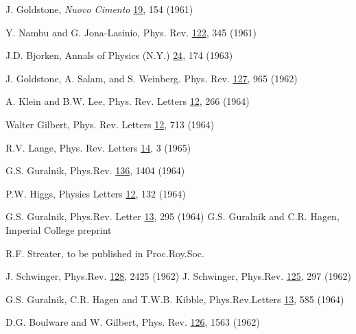 \documentclass[%
  12pt,
  paper=letter,
  abstracton,
  pagesize=auto,
  version=last,
  DIV=calc
  ]{scrartcl}
\begin{document}
\begin{thebibliography}{99}

J. Goldstone, {\it Nuovo Cimento} {\underline {19}},  154 (1961)

Y. Nambu and G. Jona-Lasinio, Phys. Rev. {\underline{122}}, 345 (1961)

J.D. Bjorken, Annals of Physics (N.Y.) {\underline {24}}, 174 (1963)

J. Goldstone, A. Salam, and S. Weinberg.  Phys. Rev. {\underline {127}}, 965 (1962)

A. Klein and B.W. Lee, Phys. Rev. Letters {\underline {12}}, 266 (1964)

Walter Gilbert, Phys. Rev. Letters {\underline{12}}, 713 (1964)

R.V. Lange, Phys. Rev. Letters {\underline {14}}, 3 (1965)

G.S. Guralnik, Phys.Rev. {\underline{136}}, 1404 (1964)

P.W. Higgs, Physics Letters {\underline{12}}, 132 (1964)

G.S. Guralnik, Phys.Rev. Letter {\underline{13}}, 295 (1964)
\newline G.S. Guralnik and C.R. Hagen, Imperial College preprint

R.F. Streater, to be published in Proc.Roy.Soc.

J. Schwinger, Phys.Rev. {\underline{128}}, 2425 (1962)
\newline J. Schwinger, Phys.Rev. {\underline {125}}, 297 (1962)

G.S. Guralnik, C.R. Hagen and T.W.B. Kibble, Phys.Rev.Letters {\underline {13}}, 585 (1964)

D.G. Boulware and W. Gilbert, Phys. Rev. {\underline {126}}, 1563 (1962)

\end{thebibliography}
\end{document}
